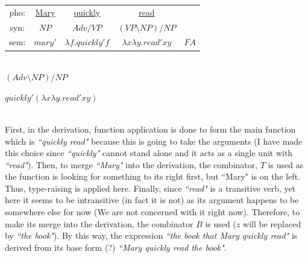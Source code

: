 \documentclass[12pt,a4paper]{article}
\begin{document}
\begin{tabular}{ccccc}
pho: & \underline{Mary}  & \underline{quickly} & \underline{read} & \\
syn: & $NP$  & $Adv/VP$   & $(VP\setminus NP)/NP$ & \\
sem: & $mary'$ & $\lambda f.quickly' f$    & $\lambda x \lambda y.read'xy$ & $FA$  \\ \cline{3-4}
\end{tabular}\\

\hspace{3cm} $(Adv\setminus NP)/NP$

\hspace{3cm} $quickly'(\lambda x \lambda y.read'xy)$\\
\\

First, in the derivation, function application is done to form the main function which is \textit{``quickly read"} because this is going to take the arguments (I have made this choice since \textit{``quickly"} cannot stand alone and it acts as a single unit with \textit{``read"}). Then, to merge \textit{``Mary"} into the derivation, the combinator, $T$ is used as the function is looking for something to its right first, but ``Mary" is on the left. Thus, type-raising is applied here. Finally, since \textit{``read"} is a transitive verb, yet here it seems to be intransitive (in fact it is not) as its argument happens to be somewhere else for now (We are not concerned with it right now). Therefore, to make its merge into the derivation, the combinator $B$ is used ($z$ will be replaced by \textit{``the book"}). By this way, the expression \textit{``the book that Mary quickly read"} is derived from its base form (?) \textit{``Mary quickly read the book"}.
\clearpage
\end{document}
